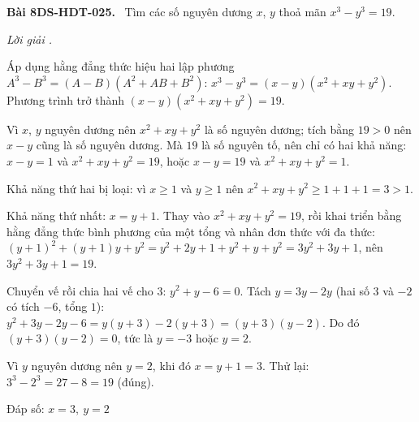 \documentclass[12pt,a4paper]{article}
\newenvironment{problem}[1][]{\par\medskip\noindent\textbf{Bài #1.}\ }{\par}
\newenvironment{solution}[1][]{\par\noindent\textit{Lời giải #1.}\par}{\par}
\begin{document}
\begin{problem}[8DS-HDT-025]
Tìm các số nguyên dương $x$, $y$ thoả mãn $x^3 - y^3 = 19$.

\begin{solution}
Áp dụng hằng đẳng thức hiệu hai lập phương $A^3 - B^3 = (A - B)(A^2 + AB + B^2)$: $x^3 - y^3 = (x - y)(x^2 + xy + y^2)$. Phương trình trở thành $(x - y)(x^2 + xy + y^2) = 19$.

Vì $x$, $y$ nguyên dương nên $x^2 + xy + y^2$ là số nguyên dương; tích bằng $19 > 0$ nên $x - y$ cũng là số nguyên dương. Mà $19$ là số nguyên tố, nên chỉ có hai khả năng: $x - y = 1$ và $x^2 + xy + y^2 = 19$, hoặc $x - y = 19$ và $x^2 + xy + y^2 = 1$.

Khả năng thứ hai bị loại: vì $x \geq 1$ và $y \geq 1$ nên $x^2 + xy + y^2 \geq 1 + 1 + 1 = 3 > 1$.

Khả năng thứ nhất: $x = y + 1$. Thay vào $x^2 + xy + y^2 = 19$, rồi khai triển bằng hằng đẳng thức bình phương của một tổng và nhân đơn thức với đa thức: $(y + 1)^2 + (y + 1)y + y^2 = y^2 + 2y + 1 + y^2 + y + y^2 = 3y^2 + 3y + 1$, nên $3y^2 + 3y + 1 = 19$.

Chuyển vế rồi chia hai vế cho $3$: $y^2 + y - 6 = 0$. Tách $y = 3y - 2y$ (hai số $3$ và $-2$ có tích $-6$, tổng $1$): $y^2 + 3y - 2y - 6 = y(y + 3) - 2(y + 3) = (y + 3)(y - 2)$. Do đó $(y + 3)(y - 2) = 0$, tức là $y = -3$ hoặc $y = 2$.

Vì $y$ nguyên dương nên $y = 2$, khi đó $x = y + 1 = 3$. Thử lại: $3^3 - 2^3 = 27 - 8 = 19$ (đúng).

Đáp số: $\boxed{x = 3,\ y = 2}$
\end{solution}
\end{problem}
\end{document}
